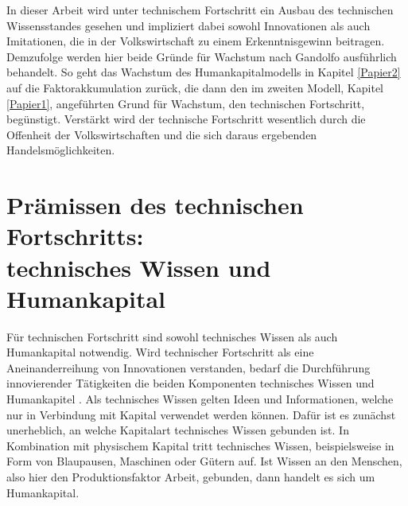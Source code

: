 %
In dieser Arbeit wird unter technischem Fortschritt ein Ausbau des technischen Wissensstandes gesehen und impliziert dabei sowohl Innovationen als auch Imitationen, die in der Volkswirtschaft zu einem Erkenntnisgewinn beitragen.\\
%
Demzufolge werden hier beide Gründe für Wachstum nach Gandolfo ausführlich behandelt. So geht das Wachstum des Humankapitalmodells in Kapitel \ref{Papier2} auf die Faktorakkumulation zurück, die dann den im zweiten Modell, Kapitel \ref{Papier1}, angeführten Grund für Wachstum, den technischen Fortschritt, begünstigt. Verstärkt wird der technische Fortschritt wesentlich durch die Offenheit der Volkswirtschaften und die sich daraus ergebenden Handelsmöglichkeiten. 
%
\section{Prämissen des technischen Fortschritts:\\technisches Wissen und Humankapital}\label{sec:TechnischesWissenHumankapital}
%
Für technischen Fortschritt sind sowohl technisches Wissen als auch Humankapital notwendig. Wird technischer Fortschritt als eine Aneinanderreihung von Innovationen  verstanden, bedarf die Durchführung innovierender Tätigkeiten die beiden Komponenten technisches Wissen und Humankapitel \cite{Howitt.2005}. Als technisches Wissen gelten Ideen und Informationen, welche nur in Verbindung mit Kapital verwendet werden können. Dafür ist es zunächst unerheblich, an welche Kapitalart technisches Wissen gebunden ist. In Kombination mit physischem Kapital tritt technisches Wissen, beispielsweise in Form von Blaupausen, Maschinen oder Gütern auf. Ist Wissen an den Menschen, also hier den Produktionsfaktor Arbeit, gebunden, dann handelt es sich um Humankapital.
%
